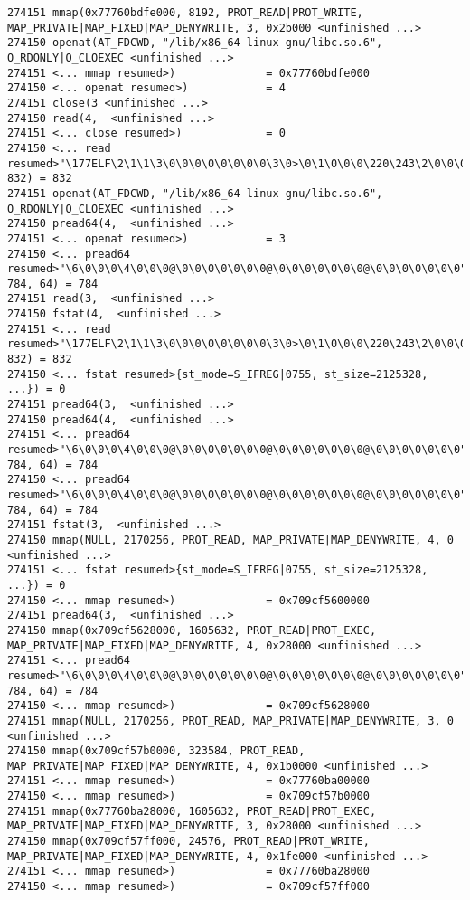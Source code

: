\begin{verbatim}
274151 mmap(0x77760bdfe000, 8192, PROT_READ|PROT_WRITE, MAP_PRIVATE|MAP_FIXED|MAP_DENYWRITE, 3, 0x2b000 <unfinished ...>
274150 openat(AT_FDCWD, "/lib/x86_64-linux-gnu/libc.so.6", O_RDONLY|O_CLOEXEC <unfinished ...>
274151 <... mmap resumed>)              = 0x77760bdfe000
274150 <... openat resumed>)            = 4
274151 close(3 <unfinished ...>
274150 read(4,  <unfinished ...>
274151 <... close resumed>)             = 0
274150 <... read resumed>"\177ELF\2\1\1\3\0\0\0\0\0\0\0\0\3\0>\0\1\0\0\0\220\243\2\0\0\0\0\0"..., 832) = 832
274151 openat(AT_FDCWD, "/lib/x86_64-linux-gnu/libc.so.6", O_RDONLY|O_CLOEXEC <unfinished ...>
274150 pread64(4,  <unfinished ...>
274151 <... openat resumed>)            = 3
274150 <... pread64 resumed>"\6\0\0\0\4\0\0\0@\0\0\0\0\0\0\0@\0\0\0\0\0\0\0@\0\0\0\0\0\0\0"..., 784, 64) = 784
274151 read(3,  <unfinished ...>
274150 fstat(4,  <unfinished ...>
274151 <... read resumed>"\177ELF\2\1\1\3\0\0\0\0\0\0\0\0\3\0>\0\1\0\0\0\220\243\2\0\0\0\0\0"..., 832) = 832
274150 <... fstat resumed>{st_mode=S_IFREG|0755, st_size=2125328, ...}) = 0
274151 pread64(3,  <unfinished ...>
274150 pread64(4,  <unfinished ...>
274151 <... pread64 resumed>"\6\0\0\0\4\0\0\0@\0\0\0\0\0\0\0@\0\0\0\0\0\0\0@\0\0\0\0\0\0\0"..., 784, 64) = 784
274150 <... pread64 resumed>"\6\0\0\0\4\0\0\0@\0\0\0\0\0\0\0@\0\0\0\0\0\0\0@\0\0\0\0\0\0\0"..., 784, 64) = 784
274151 fstat(3,  <unfinished ...>
274150 mmap(NULL, 2170256, PROT_READ, MAP_PRIVATE|MAP_DENYWRITE, 4, 0 <unfinished ...>
274151 <... fstat resumed>{st_mode=S_IFREG|0755, st_size=2125328, ...}) = 0
274150 <... mmap resumed>)              = 0x709cf5600000
274151 pread64(3,  <unfinished ...>
274150 mmap(0x709cf5628000, 1605632, PROT_READ|PROT_EXEC, MAP_PRIVATE|MAP_FIXED|MAP_DENYWRITE, 4, 0x28000 <unfinished ...>
274151 <... pread64 resumed>"\6\0\0\0\4\0\0\0@\0\0\0\0\0\0\0@\0\0\0\0\0\0\0@\0\0\0\0\0\0\0"..., 784, 64) = 784
274150 <... mmap resumed>)              = 0x709cf5628000
274151 mmap(NULL, 2170256, PROT_READ, MAP_PRIVATE|MAP_DENYWRITE, 3, 0 <unfinished ...>
274150 mmap(0x709cf57b0000, 323584, PROT_READ, MAP_PRIVATE|MAP_FIXED|MAP_DENYWRITE, 4, 0x1b0000 <unfinished ...>
274151 <... mmap resumed>)              = 0x77760ba00000
274150 <... mmap resumed>)              = 0x709cf57b0000
274151 mmap(0x77760ba28000, 1605632, PROT_READ|PROT_EXEC, MAP_PRIVATE|MAP_FIXED|MAP_DENYWRITE, 3, 0x28000 <unfinished ...>
274150 mmap(0x709cf57ff000, 24576, PROT_READ|PROT_WRITE, MAP_PRIVATE|MAP_FIXED|MAP_DENYWRITE, 4, 0x1fe000 <unfinished ...>
274151 <... mmap resumed>)              = 0x77760ba28000
274150 <... mmap resumed>)              = 0x709cf57ff000

\end{verbatim}
